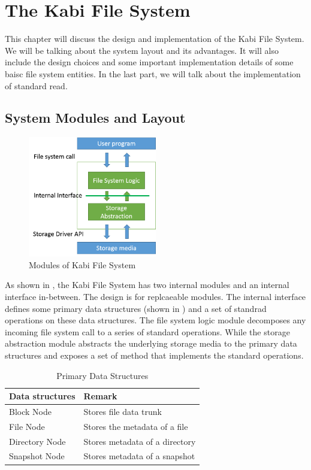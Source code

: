\chapter{The Kabi File System}
\label{chap:fs}

This chapter will discuss the design and implementation of the Kabi File System. We will be talking about the system layout and its advantages. It will also include the design choices and some important implementation details of some baisc file system entities. In the last part, we will talk about the implementation of standard read.

\section{System Modules and Layout}

\begin{figure}[hbtp]
\centering
\includegraphics[width=0.5\textwidth]{Chapter-3/figs/fig8.png}
\caption{Modules of Kabi File System}
\label{fig:modules}
\end{figure}

    As shown in , the Kabi File System has two internal modules and an internal interface in-between. The design is for replcaeable modules. The internal interface defines some primary data structures (shown in ) and a set of standrad operations on these data structures. The file system logic module decomposes any incoming file system call to a series of standard operations. While the storage abstraction module abstracts the underlying storage media to the primary data structures and exposes a set of method that implements the standard operations.

\begin{table}
\caption{Primary Data Structures}
\label{tab:data_struct}
\begin{center}
\begin{tabular}{ll}
\toprule
Data structures & Remark\\
\midrule
Block Node & Stores file data trunk\\
File Node & Stores the metadata of a file\\
Directory Node & Stores metadata of a directory \\
Snapshot Node & Stores metadata of a snapshot\\
\bottomrule
\end{tabular}
\end{center}
\end{table}

